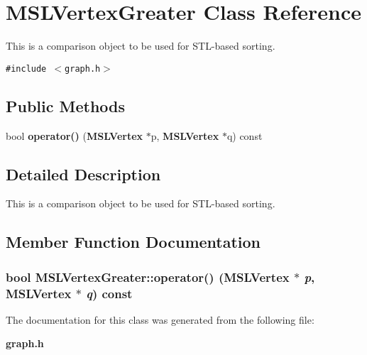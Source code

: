 \section{MSLVertex\-Greater  Class Reference}
\label{classMSLVertexGreater}
This is a comparison object to be used for STL-based sorting. 


{\tt \#include $<$graph.h$>$}

\subsection*{Public Methods}
\begin{CompactItemize}
\item 
bool {\bf operator()} ({\bf MSLVertex} $\ast$p, {\bf MSLVertex} $\ast$q) const
\end{CompactItemize}


\subsection{Detailed Description}
This is a comparison object to be used for STL-based sorting.



\subsection{Member Function Documentation}
\subsubsection{\setlength{\rightskip}{0pt plus 5cm}bool MSLVertex\-Greater::operator() ({\bf MSLVertex} $\ast$ {\em p}, {\bf MSLVertex} $\ast$ {\em q}) const\hspace{0.3cm}{\tt  [inline]}}\label{classMSLVertexGreater_a0}




The documentation for this class was generated from the following file:\begin{CompactItemize}
\item 
{\bf graph.h}\end{CompactItemize}
